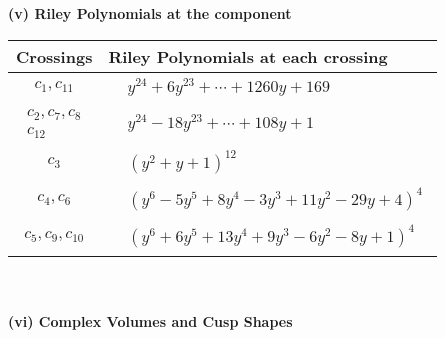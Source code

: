 \documentclass[1p]{elsarticle_modified}
\theoremstyle{definition}
\begin{document}
\newpage\renewcommand{\arraystretch}{1}
\flushleft \textbf{(v) Riley Polynomials at the component}\newline \\
\begin{tabular}{m{50pt}|m{274pt}}
Crossings & \hspace{64pt}Riley Polynomials at each crossing \\
\hline $$\begin{aligned}c_{1},c_{11}\end{aligned}$$&$\begin{aligned}
&y^{24}+6 y^{23}+\cdots+1260 y+169
\end{aligned}$\\
\hline $$\begin{aligned}c_{2},c_{7},c_{8}\\c_{12}\end{aligned}$$&$\begin{aligned}
&y^{24}-18 y^{23}+\cdots+108 y+1
\end{aligned}$\\
\hline $$\begin{aligned}c_{3}\end{aligned}$$&$\begin{aligned}
&(y^2+y+1)^{12}
\end{aligned}$\\
\hline $$\begin{aligned}c_{4},c_{6}\end{aligned}$$&$\begin{aligned}
&(y^6-5 y^5+8 y^4-3 y^3+11 y^2-29 y+4)^4
\end{aligned}$\\
\hline $$\begin{aligned}c_{5},c_{9},c_{10}\end{aligned}$$&$\begin{aligned}
&(y^6+6 y^5+13 y^4+9 y^3-6 y^2-8 y+1)^4
\end{aligned}$\\
\hline
\end{tabular}\\~\\
\newpage\flushleft \textbf{(vi) Complex Volumes and Cusp Shapes}
\end{document}
